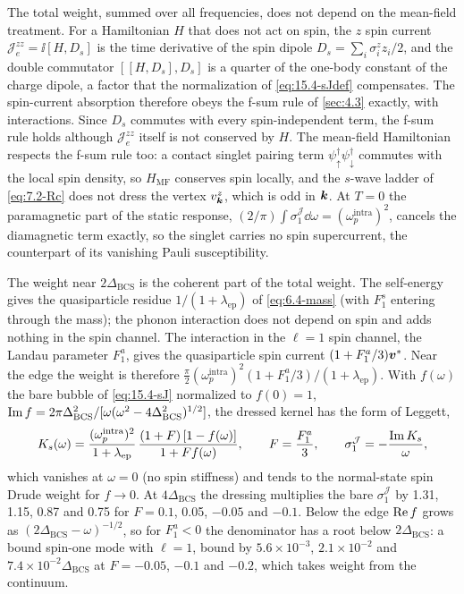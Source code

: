 The total weight, summed over all frequencies, does not depend on the mean-field treatment. For a Hamiltonian $H$ that does not act on spin, the $z$ spin current $\mathcal{J}^{zz}_e = \ii[H, D_s]$ is the time derivative of the spin dipole $D_s = \sum_i\sigma^z_iz_i/2$, and the double commutator $[[H, D_s], D_s]$ is a quarter of the one-body constant of the charge dipole, a factor that the normalization of \cref{eq:15.4-sJdef} compensates. The spin-current absorption therefore obeys the f-sum rule of \cref{sec:4.3} exactly, with interactions. Since $D_s$ commutes with every spin-independent term, the f-sum rule holds although $\mathcal{J}^{zz}_e$ itself is not conserved by $H$. The mean-field Hamiltonian respects the f-sum rule too: a contact singlet pairing term $\psi^\dagger_\uparrow\psi^\dagger_\downarrow$ commutes with the local spin density, so $H_{\mathrm{MF}}$ conserves spin locally, and the $s$-wave ladder of \cref{eq:7.2-Rc} does not dress the vertex $v^z_{\bm{k}}$, which is odd in $\bm{k}$. At $T = 0$ the paramagnetic part of the static response, $(2/\pi)\int\sigma_1^{\mathcal{J}}\dd\omega = (\omega_p^{\mathrm{intra}})^2$, cancels the diamagnetic term exactly, so the singlet carries no spin supercurrent, the counterpart of its vanishing Pauli susceptibility.

The weight near $2\Delta_{\mathrm{BCS}}$ is the coherent part of the total weight. The self-energy gives the quasiparticle residue $1/(1 + \lambda_{\mathrm{ep}})$ of \cref{eq:6.4-mass} (with $F_1^s$ entering through the mass); the phonon interaction does not depend on spin and adds nothing in the spin channel. The interaction in the $\ell = 1$ spin channel, the Landau parameter $F_1^a$, gives the quasiparticle spin current $(1 + F_1^a/3)\bm{v}^*$. Near the edge the weight is therefore $\frac{\pi}{2}(\omega_p^{\mathrm{intra}})^2(1 + F_1^a/3)/(1 + \lambda_{\mathrm{ep}})$. With $f(\omega)$ the bare bubble of \cref{eq:15.4-sJ} normalized to $f(0) = 1$, $\operatorname{Im} f = 2\pi\Delta_{\mathrm{BCS}}^2/[\omega(\omega^2 - 4\Delta_{\mathrm{BCS}}^2)^{1/2}]$, the dressed kernel has the form of Leggett,
\begin{equation*}
  K_s(\omega) = \frac{(\omega_p^{\mathrm{intra}})^2}{1 + \lambda_{\mathrm{ep}}}\,\frac{(1 + F)\,[1 - f(\omega)]}{1 + F f(\omega)} , \qquad F = \frac{F_1^a}{3} , \qquad \sigma_1^{\mathcal{J}} = -\frac{\operatorname{Im} K_s}{\omega} ,
\end{equation*}
which vanishes at $\omega = 0$ (no spin stiffness) and tends to the normal-state spin Drude weight for $f \to 0$. At $4\Delta_{\mathrm{BCS}}$ the dressing multiplies the bare $\sigma_1^{\mathcal{J}}$ by 1.31, 1.15, 0.87 and 0.75 for $F = 0.1$, 0.05, $-0.05$ and $-0.1$. Below the edge $\operatorname{Re} f$ grows as $(2\Delta_{\mathrm{BCS}} - \omega)^{-1/2}$, so for $F_1^a < 0$ the denominator has a root below $2\Delta_{\mathrm{BCS}}$: a bound spin-one mode with $\ell = 1$, bound by $5.6\times10^{-3}$, $2.1\times10^{-2}$ and $7.4\times10^{-2}\Delta_{\mathrm{BCS}}$ at $F = -0.05$, $-0.1$ and $-0.2$, which takes weight from the continuum.

